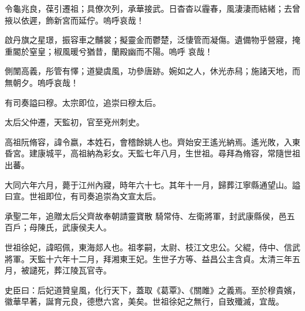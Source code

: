 \begin{pinyinscope}
 令龜兆良，葆引遷祖；具僚次列，承華接武。日杳杳以霾春，風淒淒而結緒；去曾掖以依遲，飾新宮而延佇。嗚呼哀哉！



 啟丹旗之星璟，振容車之黼裳；擬靈金而鬱楚，泛悽管而凝傷。遺備物乎營寢，掩重閽於窒皇；椒風暖兮猶昔，蘭殿幽而不陽。嗚呼
 哀哉！



 側闈高義，彤管有懌；道變虞風，功參唐跡。婉如之人，休光赤舄；施諸天地，而無朝夕。嗚呼哀哉！



 有司奏謚曰穆。太宗即位，追崇曰穆太后。



 太后父仲遷，天監初，官至兗州刺史。



 高祖阮脩容，諱令嬴，本姓石，會稽餘姚人也。齊始安王遙光納焉。遙光敗，入東昏宮。建康城平，高祖納為彩女。天監七年八月，生世祖。尋拜為脩容，常隨世祖出蕃。



 大同六年六月，薨于江州內寢，時年六十七。其年十一月，歸葬江寧縣通望山。謚曰宣。世祖即位，有司奏追崇為文宣太后。



 承聖二年，追贈太后父齊故奉朝請靈寶散
 騎常侍、左衛將軍，封武康縣侯，邑五百戶；母陳氏，武康侯夫人。



 世祖徐妃，諱昭佩，東海郯人也。祖孝嗣，太尉、枝江文忠公。父緄，侍中、信武將軍。天監十六年十二月，拜湘東王妃。生世子方等、益昌公主含貞。太清三年五月，被譴死，葬江陵瓦官寺。



 史臣曰：后妃道贊皇風，化行天下，蓋取《葛覃》、《關雎》之義焉。至於穆貴嬪，徽華早著，誕育元良，德懋六宮，美矣。世祖徐妃之無行，自致殲滅，宜哉。



\end{pinyinscope}